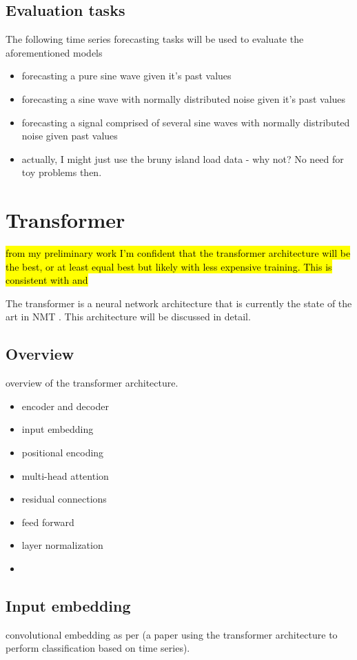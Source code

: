 \subsection{Evaluation tasks}
The following time series forecasting tasks will be used to evaluate the aforementioned models
\begin{itemize}
	\item forecasting a pure sine wave given it's past values
	\item forecasting a sine wave with normally distributed noise given it's past values
	\item forecasting a signal comprised of several sine waves with normally distributed noise given past values
	\item actually, I might just use the bruny island load data - why not? No need for toy problems then.
\end{itemize}


\section{Transformer}
\hl{from my preliminary work I'm confident that the transformer architecture will be the best, or at least equal best but likely with less expensive training. This is consistent with \protect\cite{Song2017} and \protect\cite{Vaswani2017}}\\
\par
The transformer is a neural network architecture that is currently the state of the art in NMT \citep{Vaswani2017}.
This architecture will be discussed in detail. 

\subsection{Overview}
overview of the transformer architecture.
\begin{itemize}
	\item encoder and decoder
	\item input embedding
	\item positional encoding
	\item multi-head attention
	\item residual connections
	\item feed forward
	\item layer normalization
	\item 
\end{itemize}

\subsection{Input embedding}
convolutional embedding as per \citep{Song2017} (a paper using the transformer architecture to perform classification based on time series).

